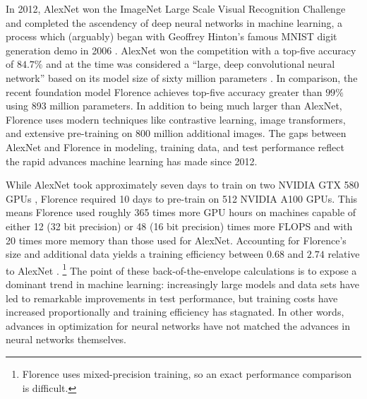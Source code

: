 
In 2012, AlexNet won the ImageNet Large Scale Visual Recognition Challenge
\citep{deng2009imagenet} and completed the ascendency of deep neural networks in
machine learning, a process which (arguably) began with Geoffrey Hinton's
famous MNIST digit generation demo in 2006 \citep{hinton2006deep}.
AlexNet won the competition with a top-five accuracy of \( 84.7\%  \) and at
the time was considered a ``large, deep convolutional neural network'' based on
its model size of sixty million parameters \citep{russakovksy2015imagenet}.
In comparison, the recent foundation model Florence
\citep{yuan2021florence} achieves top-five accuracy greater than \( 99\% \)
using 893 million parameters.
In addition to being much larger than AlexNet, Florence uses modern techniques
like contrastive learning, image transformers, and extensive pre-training on
800 million additional images.
The gaps between AlexNet and Florence in modeling, training data, and test
performance reflect the rapid advances machine learning has made since 2012.

While AlexNet took approximately seven days to train on two NVIDIA GTX 580 GPUs
\citep{krizhevksy2012alexnet}, Florence required 10 days to pre-train on 512
NVIDIA A100 GPUs.
This means Florence used roughly 365 times more GPU hours on machines capable
of either 12 (32 bit precision) or 48 (16 bit precision)
times more FLOPS and with 20 times more memory than those used for AlexNet.
Accounting for Florence's size and additional data yields a training
efficiency between \( 0.68 \) and \( 2.74 \) relative to AlexNet
\citep{a100, gpucomparison}.%
\footnote{Florence uses mixed-precision training, so an exact performance
    comparison is difficult.}
The point of these back-of-the-envelope calculations is to expose a dominant
trend in machine learning:
increasingly large models and data sets have led to remarkable improvements in
test performance, but training costs have increased proportionally and
training efficiency has stagnated.
In other words, advances in optimization for neural networks have not matched
the advances in neural networks themselves.

